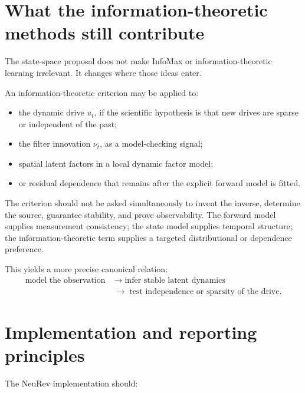 \documentclass[11pt]{article}
\begin{document}
\section{What the information-theoretic methods still contribute}

The state-space proposal does not make InfoMax or information-theoretic learning
irrelevant. It changes where those ideas enter.

An information-theoretic criterion may be applied to:
\begin{itemize}[leftmargin=*]
\item the dynamic drive \(u_t\), if the scientific hypothesis is that new drives
  are sparse or independent of the past;
\item the filter innovation \(\nu_t\), as a model-checking signal;
\item spatial latent factors in a local dynamic factor model;
\item or residual dependence that remains after the explicit forward model is
  fitted.
\end{itemize}

The criterion should not be asked simultaneously to invent the inverse,
determine the source, guarantee stability, and prove observability. The forward
model supplies measurement consistency; the state model supplies temporal
structure; the information-theoretic term supplies a targeted distributional or
dependence preference.

This yields a more precise canonical relation:
\begin{equation}
\begin{aligned}
\text{model the observation}
&\;\longrightarrow\;
\text{infer stable latent dynamics}\\
&\;\longrightarrow\;
\text{test independence or sparsity of the drive}.
\end{aligned}
\end{equation}

\section{Implementation and reporting principles}

The NeuRev implementation should:
\end{document}
